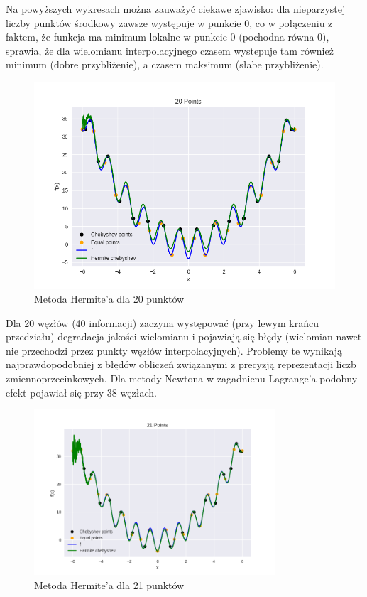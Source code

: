 \documentclass{article}
\begin{document}
Na powyższych wykresach można zauważyć ciekawe zjawisko: dla nieparzystej liczby punktów środkowy zawsze występuje w punkcie 0, co
w połączeniu z faktem, że funkcja ma minimum lokalne w punkcie 0 (pochodna równa 0), sprawia, że dla wielomianu interpolacyjnego czasem
wystepuje tam również minimum (dobre przybliżenie), a czasem maksimum (słabe przybliżenie).

\begin{figure}[H]
    \centering
    \includegraphics[width=\textwidth]{img/herm_20.png}
    \caption{Metoda Hermite'a dla 20 punktów}
\end{figure}

Dla 20 węzłów (40 informacji) zaczyna występować (przy lewym krańcu przedziału) degradacja jakości wielomianu i pojawiają się błędy (wielomian nawet
nie przechodzi przez punkty węzłów interpolacyjnych). Problemy te wynikają najprawdopodobniej z błędów obliczeń związanymi z precyzją
reprezentacji liczb zmiennoprzecinkowych. Dla metody Newtona w zagadnienu Lagrange'a podobny efekt pojawiał się przy 38 węzłach.

\begin{figure}[H]
    \centering
    \includegraphics[width=0.8\textwidth]{img/herm_21.png}
    \caption{Metoda Hermite'a dla 21 punktów}
\end{figure}
\end{document}
